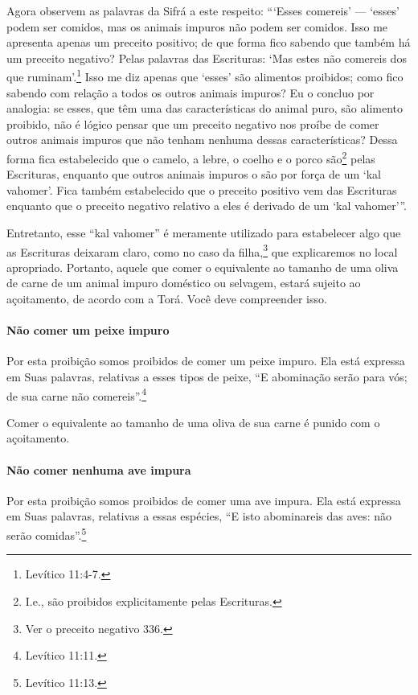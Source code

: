 Agora observem as palavras da Sifrá a este respeito: ```Esses comereis'
--- `esses' podem ser comidos, mas os animais impuros não podem ser
comidos. Isso me apresenta apenas um preceito positivo; de que forma
fico sabendo que também há um preceito negativo? Pelas palavras das
Escrituras: `Mas estes não comereis dos que ruminam'.\footnote{Levítico 11:4-7.}
Isso me diz apenas que `esses' são alimentos proibidos; como fico
sabendo com relação a todos os outros animais impuros? Eu o concluo por
analogia: se esses, que têm uma das características do animal puro, são
alimento proibido, não é lógico pensar que um preceito negativo nos
proíbe de comer outros animais impuros que não tenham nenhuma dessas
características? Dessa forma fica estabelecido que o camelo, a lebre, o
coelho e o porco são\footnote{I.e., são proibidos explicitamente pelas Escrituras.} pelas Escrituras, enquanto
que outros animais impuros o são por força de um `kal vahomer'. Fica
também estabelecido que o preceito positivo vem das Escrituras enquanto
que o preceito negativo relativo a eles é derivado de um `kal
vahomer'''.

Entretanto, esse ``kal vahomer'' é meramente utilizado para estabelecer
algo que as Escrituras deixaram claro, como no caso da
filha,\footnote{Ver o preceito negativo 336.} que explicaremos no local apropriado.
Portanto, aquele que comer o equivalente ao tamanho de uma oliva de
carne de um animal impuro doméstico ou selvagem, estará sujeito ao
açoitamento, de acordo com a Torá. Você deve compreender isso.


\paragraph{Não comer um peixe impuro}

Por esta proibição somos proibidos de comer um peixe impuro. Ela está
expressa em Suas palavras, relativas a esses tipos de peixe, ``E
abominação serão para vós; de sua carne não comereis''.\footnote{Levítico 11:11.}

Comer o equivalente ao tamanho de uma oliva de sua carne é punido com o
açoitamento.

\paragraph{Não comer nenhuma ave impura}

Por esta proibição somos proibidos de comer uma ave impura. Ela está
expressa em Suas palavras, relativas a essas espécies, ``E isto
abominareis das aves: não serão comidas''.\footnote{Levítico 11:13.}

